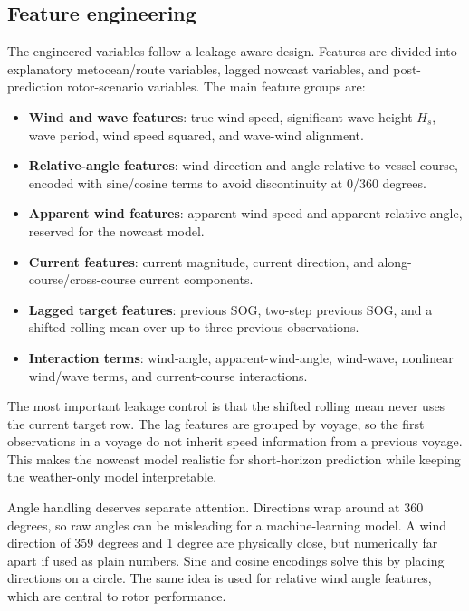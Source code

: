 \documentclass[10pt,a4paper]{article}
\newcommand{\hs}{$H_s$}
\newcommand{\sog}{SOG}
\begin{document}
\subsection{Feature engineering}

The engineered variables follow a leakage-aware design. Features are divided
into explanatory metocean/route variables, lagged nowcast variables, and
post-prediction rotor-scenario variables. The main feature groups are:

\begin{itemize}
    \item \textbf{Wind and wave features}: true wind speed, significant wave
    height \hs{}, wave period, wind speed squared, and wave-wind alignment.
    \item \textbf{Relative-angle features}: wind direction and angle relative to
    vessel course, encoded with sine/cosine terms to avoid discontinuity at
    0/360 degrees.
    \item \textbf{Apparent wind features}: apparent wind speed and apparent
    relative angle, reserved for the nowcast model.
    \item \textbf{Current features}: current magnitude, current direction, and
    along-course/cross-course current components.
    \item \textbf{Lagged target features}: previous \sog{}, two-step previous
    \sog{}, and a shifted rolling mean over up to three previous observations.
    \item \textbf{Interaction terms}: wind-angle, apparent-wind-angle,
    wind-wave, nonlinear wind/wave terms, and current-course interactions.
\end{itemize}

The most important leakage control is that the shifted rolling mean never uses
the current target row. The lag features are grouped by voyage, so the first
observations in a voyage do not inherit speed information from a previous
voyage. This makes the nowcast model realistic for short-horizon prediction
while keeping the weather-only model interpretable.

Angle handling deserves separate attention. Directions wrap around at
360 degrees, so raw angles can be misleading for a machine-learning model. A
wind direction of 359 degrees and 1 degree are physically close, but numerically
far apart if used as plain numbers. Sine and cosine encodings solve this by
placing directions on a circle. The same idea is used for relative wind angle
features, which are central to rotor performance.
\end{document}
